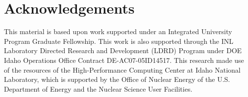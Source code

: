 \documentclass[review]{elsarticle}
\begin{document}
\section{Acknowledgements}

This material is based upon work supported under an Integrated University Program Graduate Fellowship. This work is also supported through the INL Laboratory Directed Research and Development (LDRD) Program under DOE Idaho Operations Office Contract DE-AC07-05ID14517. This research made use of the resources of the High-Performance Computing Center at Idaho National Laboratory, which is supported by the Office of Nuclear Energy of the U.S. Department of Energy and the Nuclear Science User Facilities.    


\end{document}
